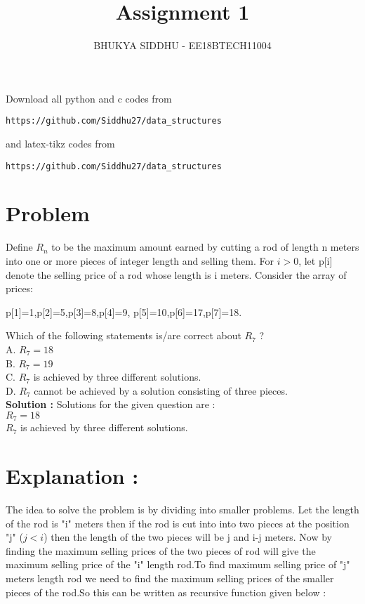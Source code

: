 \documentclass[journal,12pt,twocolumn]{IEEEtran}
\begin{document}
     \def\rightbox#1{\makebox[0in][r]{#1}}
     \def\centbox#1{\makebox[0in]{#1}}
     \def\topbox#1{\raisebox{-\baselineskip}[0in][0in]{#1}}
     \def\midbox#1{\raisebox{-0.5\baselineskip}[0in][0in]{#1}}
\vspace{3cm}
\title{Assignment 1}
\author{BHUKYA SIDDHU - EE18BTECH11004}
\maketitle
\newpage
\bigskip
\renewcommand{\thefigure}{\theenumi}
\renewcommand{\thetable}{\theenumi}
Download all python and c codes from 
\begin{lstlisting}
https://github.com/Siddhu27/data_structures
\end{lstlisting}
%
and latex-tikz codes from 
%
\begin{lstlisting}
https://github.com/Siddhu27/data_structures
\end{lstlisting}
\section{Problem}
Define $R_{n}$ to be the maximum amount earned by cutting a rod of length n meters into one or more pieces of integer length and selling them. For $i>0$, let p[i] denote the selling price of a rod whose length is i meters. Consider the array of prices:\\
\begin{center}
    p[1]=1,p[2]=5,p[3]=8,p[4]=9,
    p[5]=10,p[6]=17,p[7]=18.
\end{center}
Which of the following statements is/are correct about $R_{7}$ ?\\
\newline
A. $R_{7}=18$\\
B. $R_{7}=19$\\
C. $R_{7}$ is achieved by three different solutions.\\
D. $R_{7}$ cannot be achieved by a solution consisting of three pieces.\\
\newline
\textbf{Solution :}
\newline
Solutions for the given question are :\\
$R_{7}=18$\\
$R_{7}$ is achieved by three different solutions.\\
\section{Explanation :}
The idea to solve the problem is by dividing into smaller problems. Let the length of the rod is "i" meters then if the rod is cut into into two pieces at the position "j" ($j<i$) then the length of the two pieces will be j and i-j meters. Now by finding the maximum selling prices of the two pieces of rod will give the maximum selling price of the "i" length rod.To find maximum selling price of "j" meters length rod we need to find the maximum selling prices of the smaller pieces of the rod.So this can be written as recursive function given below :
\end{document}
